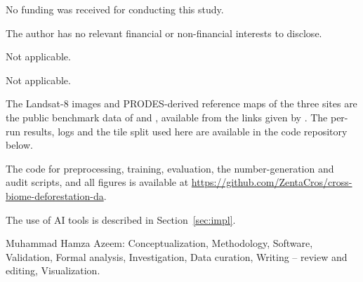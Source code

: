 \documentclass[pdflatex,sn-basic]{sn-jnl}
\begin{document}
 No funding was received for conducting this study.

 The author has no relevant financial or non-financial interests to disclose.

 Not applicable.

 Not applicable.

 The Landsat-8 images and PRODES-derived reference maps of the three sites are the public benchmark data of \citet{noa2021adversarial} and \citet{demoura2025enhancing}, available from the links given by \citet{demoura2025enhancing}. The per-run results, logs and the tile split used here are available in the code repository below.

 The code for preprocessing, training, evaluation, the number-generation and audit scripts, and all figures is available at \url{https://github.com/ZentaCros/cross-biome-deforestation-da}.

 The use of AI tools is described in Section~\ref{sec:impl}.

 Muhammad Hamza Azeem: Conceptualization, Methodology, Software, Validation, Formal analysis, Investigation, Data curation, Writing -- review and editing, Visualization.


\end{document}
